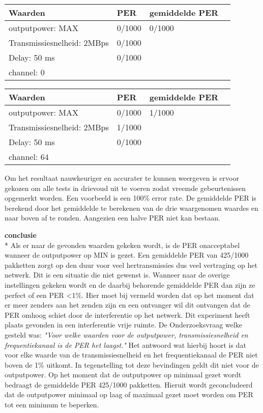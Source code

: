\documentclass{article}
\begin{document}
    
    \begin{tabular}{ | l | l | l | p{5cm} |}
    \hline
    Waarden & PER & gemiddelde PER\\ \hline
    outputpower: MAX & 0/1000 &  0/1000\\ \hline
    Transmissiesnelheid: 2MBps & 0/1000 &   \\ \hline
    Delay: 50 ms & 0/1000 &  \\
    \hline
    channel: 0 &  &  \\ \hline
    \end{tabular}
    
    
    \begin{tabular}{ | l | l | l | p{5cm} |}
    \hline
    Waarden & PER & gemiddelde PER\\ \hline
    outputpower: MAX & 0/1000 & 1/1000\\ \hline
    Transmissiesnelheid: 2MBps & 1/1000 &  \\ \hline
    Delay: 50 ms & 0/1000 &  \\
    \hline
    channel: 64 &  &  \\ \hline
    \end{tabular}
    

Om het resultaat nauwkeuriger en accurater te kunnen weergeven is ervoor gekozen om alle tests in drievoud uit te voeren zodat vreemde gebeurtenissen opgemerkt worden. Een voorbeeld is een 100\% error rate.
\newline 
De gemiddelde PER is berekend door het gemiddelde te berekenen van de drie waargenomen waardes en naar boven af te ronden. Aangezien een halve PER niet kan bestaan. 

\textbf {conclusie}  \\*
Als er naar de gevonden waarden gekeken wordt, is de PER onacceptabel wanneer de outputpower op MIN is gezet. Een gemiddelde PER van 425/1000 pakketten zorgt op den duur voor veel hertransmissies dus veel vertraging op het netwerk. Dit is een situatie die niet gewenst is. Wanneer naar de overige instellingen gekeken wordt en de daarbij behorende gemiddelde PER dan zijn ze perfect of een PER <1\%. Hier moet bij vermeld worden dat op het moment dat er meer zenders aan het zenden zijn en een ontvanger wil dit ontvangen dat de PER omhoog schiet door de interferentie op het netwerk. Dit experiment heeft plaats gevonden in een interferentie vrije ruimte.
De Onderzoeksvraag welke gesteld was: \textit{"Voor welke waarden voor de outputpower, transmissiesnelheid en frequentiekanaal is de PER het laagst."} Het antwoord wat hierbij hoort is dat voor elke waarde van de transmissiesnelheid en het frequentiekanaal de PER niet boven de 1\% uitkomt. In tegenstelling tot deze bevindingen geldt dit niet voor de outputpower. Op het moment dat de outputpower op minimaal gezet wordt bedraagt de gemiddelde PER 425/1000 pakketten. Hieruit wordt geconcludeerd dat de outputpower minimaal op laag of maximaal gezet moet worden om PER tot een minimum te beperken. 
\end{document}
